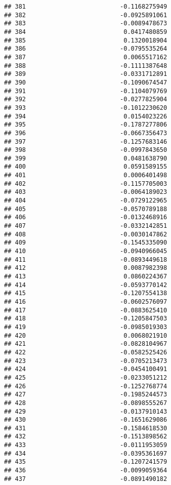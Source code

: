 \documentclass[
]{article}
\begin{document}
\begin{verbatim}
## 381                          -0.1168275949
## 382                          -0.0925891061
## 383                          -0.0089478673
## 384                           0.0417480859
## 385                           0.1320018904
## 386                          -0.0795535264
## 387                           0.0065517162
## 388                          -0.1111387648
## 389                          -0.0331712891
## 390                          -0.1090674547
## 391                          -0.1104079769
## 392                          -0.0277825904
## 393                          -0.1012230620
## 394                           0.0154023226
## 395                          -0.1787277806
## 396                          -0.0667356473
## 397                          -0.1257683146
## 398                          -0.0997843650
## 399                           0.0481638790
## 400                           0.0591589155
## 401                           0.0006401498
## 402                          -0.1157705003
## 403                          -0.0064189023
## 404                          -0.0729122965
## 405                          -0.0570789188
## 406                          -0.0132468916
## 407                          -0.0332142851
## 408                          -0.0030147862
## 409                          -0.1545335090
## 410                          -0.0940966045
## 411                          -0.0893449618
## 412                           0.0087982398
## 413                           0.0860224367
## 414                          -0.0593770142
## 415                          -0.1207554138
## 416                          -0.0602576097
## 417                          -0.0883625410
## 418                          -0.1205847503
## 419                          -0.0985019303
## 420                           0.0068021910
## 421                          -0.0828104967
## 422                          -0.0582525426
## 423                          -0.0705213473
## 424                          -0.0454100491
## 425                          -0.0233051212
## 426                          -0.1252768774
## 427                          -0.1985244573
## 428                          -0.0898555267
## 429                          -0.0137910143
## 430                          -0.1651629086
## 431                          -0.1584618530
## 432                          -0.1513898562
## 433                          -0.0111953059
## 434                          -0.0395361697
## 435                          -0.1207241579
## 436                          -0.0099059364
## 437                          -0.0891490182

\end{verbatim}
\end{document}
